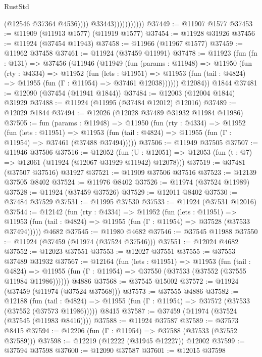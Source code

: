 \begin{lexlean}{RustStd}
\begin{coremodule}
{\begin{coremodule}
{{{{{{{{{{{{{{{{{{{{{{{{{{{{{{{{{{{{{{{{{{{{{{{{{{{{{{{{{{{{{{{{{{{{{{{{{{{{{{{{                                (@12546 @37364 @4536))))
                          @33443)))))))))))
@37449 := @11907 @1577
@37453 := @11909 (@11913 @1577) (@11919 @1577)
@37454 := @11928 @31926
@37456 := @11924 (@37454 @11943)
@37458 := @11966 (@11967 @1577)
@37459 := @11962 @37458
@37461 := @11924 (@37459 @11991)
@37478 := @11923
    (fun (fn : @131) =>
    @37456
      (@11946
        (@11949
          (fun (params : @11948) =>
          @11950
            (fun (rty : @4334) =>
            @11952
              (fun (lets : @11951) =>
              @11953 (fun (tail : @4824) => @11955 (fun (Γ : @11954) => @37461 @12038))))))
        @12084))
    @1844
@37481 := @12090 (@37454 (@11941 @1844))
@37484 := @12003 (@12004 @1844) @31929
@37488 := @11924 (@11995 (@37484 @12012) @12016)
@37489 := @12029 @1844
@37494 := @12026 (@12028 @37489 @31932 @11984 @11986)
@37505 := fun (params : @11948) =>
  @11950
    (fun (rty : @4334) =>
    @11952
      (fun (lets : @11951) =>
      @11953 (fun (tail : @4824) => @11955 (fun (Γ : @11954) => @37461 (@37488 @37494)))))
@37506 := @11949 @37505
@37507 := @11946 @37506
@37516 := @12052
    (fun (U : @12051) => @12053 (fun (t : @7) => @12061 (@11924 (@12067 @31929 @11942) @12078)))
@37519 := @37481 (@37507 @37516) @31927
@37521 := @11909 @37506 @37516
@37523 := @12139 @37505 @8402
@37524 := @11976 @8402
@37526 := @11974 (@37524 @11989)
@37528 := @11924 (@37459 @37526)
@37529 := @12011 @8402
@37530 := @37484 @37529
@37531 := @11995 @37530
@37533 := @11924 (@37531 @12016)
@37544 := @12142
    (fun (rty : @4334) =>
    @11952
      (fun (lets : @11951) =>
      @11953 (fun (tail : @4824) => @11955 (fun (Γ : @11954) => @37528 (@37533 @37494)))))
    @4682
@37545 := @11980 @4682
@37546 := @37545 @11988
@37550 := @11924 (@37459 (@11974 (@37524 @37546)))
@37551 := @12024 @4682
@37552 := @12023 @37551
@37553 := @12027 @37551
@37555 := @37553 @37489 @31932
@37567 := @12164
    (fun (lets : @11951) =>
    @11953
      (fun (tail : @4824) =>
      @11955 (fun (Γ : @11954) => @37550 (@37533 (@37552 (@37555 @11984 @11986))))))
    @4886
@37568 := @37545 @15002
@37572 := @11924 (@37459 (@11974 (@37524 @37568)))
@37573 := @37555 @4886
@37582 := @12188
    (fun (tail : @4824) => @11955 (fun (Γ : @11954) => @37572 (@37533 (@37552 (@37573 @11986)))))
    @8415
@37587 := @37459 (@11974 (@37524 (@37545 (@11983 @8416))))
@37588 := @11924 @37587
@37589 := @37573 @8415
@37594 := @12206 (fun (Γ : @11954) => @37588 (@37533 (@37552 @37589)))
@37598 := @12219 (@12222 (@31945 @12227)) @12002
@37599 := @37594 @37598
@37600 := @12090 @37587
@37601 := @12015 @37598
}}}}}}}}}}}}}}}}}}}}}}}}}}}}}}}}}}}}}}}}}}}}}}}}}}}}}}}}}}}}}}}}}}}}}}}}}}}}}}}}
\end{coremodule}}
\end{coremodule}
\end{lexlean}
